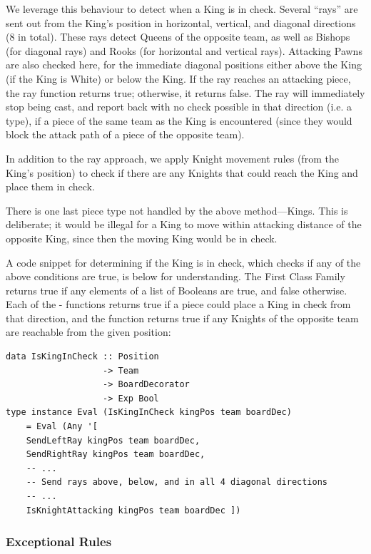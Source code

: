 We leverage this behaviour to detect when a King is in check. Several ``rays'' are sent out from the King's position in horizontal, vertical, and diagonal directions (8 in total). These rays detect Queens of the opposite team, as well as Bishops (for diagonal rays) and Rooks (for horizontal and vertical rays). Attacking Pawns are also checked here, for the immediate diagonal positions either above the King (if the King is White) or below the King. If the ray reaches an attacking piece, the ray function returns true; otherwise, it returns false. The ray will immediately stop being cast, and report back with no check possible in that direction (i.e. a  type), if a piece of the same team as the King is encountered (since they would block the attack path of a piece of the opposite team).

In addition to the ray approach, we apply Knight movement rules (from the King's position) to check if there are any Knights that could reach the King and place them in check.

There is one last piece type not handled by the above method---Kings. This is deliberate; it would be illegal for a King to move within attacking distance of the opposite King, since then the moving King would be in check.

A code snippet for determining if the King is in check, which checks if any of the above conditions are true, is below for understanding. The First Class Family  returns true if any elements of a list of Booleans are true, and false otherwise. Each of the - functions returns true if a piece could place a King in check from that direction, and the  function returns true if any Knights of the opposite team are reachable from the given position:

\begin{lstlisting}
data IsKingInCheck :: Position
                   -> Team
                   -> BoardDecorator
                   -> Exp Bool
type instance Eval (IsKingInCheck kingPos team boardDec)
    = Eval (Any '[
    SendLeftRay kingPos team boardDec,
    SendRightRay kingPos team boardDec,
    -- ...
    -- Send rays above, below, and in all 4 diagonal directions
    -- ...
    IsKnightAttacking kingPos team boardDec ])
\end{lstlisting}

\subsubsection{Exceptional Rules}

